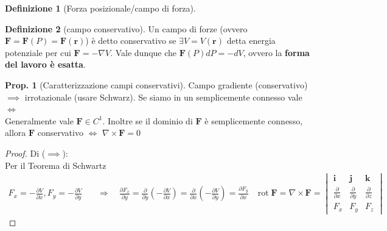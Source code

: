 \documentclass[a4paper,10pt]{article}
\theoremstyle{definition}
\DeclareMathOperator*{\rot}{rot}
\theoremstyle{indentdefinition}
\newtheorem{defn}{Definizione}[section]
\theoremstyle{indenttheorem}
\newtheorem{prop}{Prop.}
\theoremstyle{myremark}
\theoremstyle{indentgeneral}
\begin{document}
\begin{defn}[Forza posizionale/campo di forza]
\end{defn}


\begin{defn}[campo conservativo]
\label{def:campo-conservativo}Un campo di forze (ovvero $\boldsymbol{F}=\boldsymbol{F}\left(P\right)=\boldsymbol{F}\left(\boldsymbol{r}\right)$)
è detto conservativo se $\exists V=V\left(\boldsymbol{r}\right)$
detta energia potenziale per cui $\boldsymbol{F}=-\nabla V$. Vale
dunque che $\boldsymbol{F}\left(P\right)dP=-dV$, ovvero la \textbf{forma
del lavoro è esatta}.
\end{defn}

\begin{prop}[Caratterizzazione campi conservativi]
 Campo gradiente (conservativo) $\implies$ irrotazionale (usare Schwarz). Se siamo in un semplicemente connesso vale $\iff$ \\
Generalmente vale $\boldsymbol{F}\in C^{1}$. Inoltre se il dominio
di $\boldsymbol{F}$ è semplicemente connesso, allora $\boldsymbol{F}$
conservativo $\Longleftrightarrow$ $\nabla\times\boldsymbol{F}=0$

\begin{proof} Di ($\implies$): \\
Per il Teorema di Schwartz 
\begin{align*}
F_{x}=-\frac{\partial V}{\partial x},F_{y}=-\frac{\partial V}{\partial y} & \quad\Longrightarrow\quad\frac{\partial F_{x}}{\partial y}=\frac{\partial}{\partial y}\left(-\frac{\partial V}{\partial x}\right)=\frac{\partial}{\partial x}\left(-\frac{\partial V}{\partial y}\right)=\frac{\partial F_{y}}{\partial x} & \boxed{{\scriptstyle \rot\boldsymbol{F}=\nabla\times\boldsymbol{F}=\begin{vmatrix}\boldsymbol{i} & \boldsymbol{j} & \boldsymbol{k}\\
\frac{\partial}{\partial x} & \frac{\partial}{\partial y} & \frac{\partial}{\partial z}\\
F_{x} & F_{y} & F_{z}
\end{vmatrix}}}
\end{align*}
\end{proof}
\end{prop}
\end{document}
